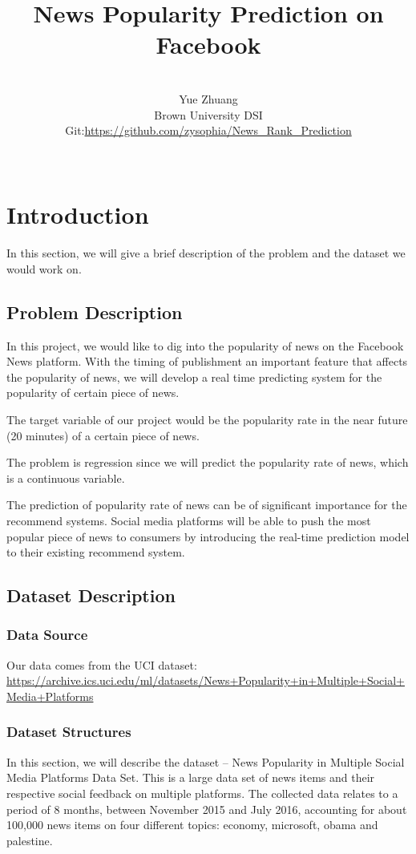 \documentclass{article}
\title{News Popularity Prediction on Facebook}
\author{\\Yue Zhuang\\
Brown University DSI\\
Git:\url{https://github.com/zysophia/News_Rank_Prediction}\\\\}
\date{}
\begin{document}
\maketitle

\section{Introduction}
In this section, we will give a brief description of the problem and the dataset we would work on.
\subsection{Problem Description}
In this project, we would like to dig into the popularity of news on the Facebook News platform. With the timing of publishment an important feature that affects the popularity of news, we will develop a real time predicting system for the popularity of certain piece of news.\par
The target variable of our project would be the popularity rate in the near future (20 minutes) of a certain piece of news.\par
The problem is regression since we will predict the popularity rate of news, which is a continuous variable.\par
The prediction of popularity rate of news can be of significant importance for the recommend systems. Social media platforms will be able to push the most popular piece of news to consumers by introducing the real-time prediction model to their existing recommend system.

\subsection{Dataset Description}
\subsubsection{Data Source}
Our data comes from the UCI dataset:
\url{https://archive.ics.uci.edu/ml/datasets/News+Popularity+in+Multiple+Social+Media+Platforms}
\subsubsection{Dataset Structures}
In this section, we will describe the dataset – News Popularity in Multiple Social Media Platforms Data Set. This is a large data set of news items and their respective social feedback on multiple platforms. The collected data relates to a period of 8 months, between November 2015 and July 2016, accounting for about 100,000 news items on four different topics: economy, microsoft, obama and palestine.
\end{document}
